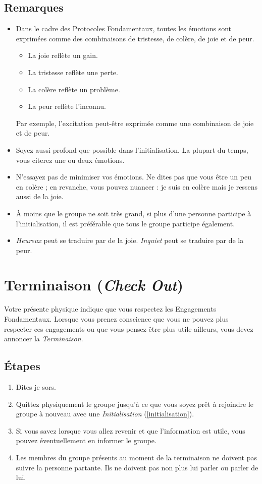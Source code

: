 \documentclass{book}
\newcommand*{\numref}[1]{{\hyperref[{#1}]{\autoref*{#1}}}}
\begin{document}
\subsection{Remarques}
\begin{itemize}
	\item Dans le cadre des Protocoles Fondamentaux, toutes les émotions sont exprimées comme des combinaisons de tristesse, de colère,
	      de joie et de peur.
	      \begin{itemize}
	      	\item La joie reflète un gain.
	      	\item La tristesse reflète une perte.
	      	\item La colère reflète un problème.
	      	\item La peur reflète l'inconnu.
	      \end{itemize}
	      Par exemple, l'excitation peut-être exprimée comme une combinaison de joie et de peur.
	\item Soyez aussi profond que possible dans l'initialisation. La plupart du temps, vous citerez une ou deux émotions. 
	\item N'essayez pas de minimiser vos émotions. Ne dites pas que vous être \og{}un peu\fg{} en colère ; en revanche, vous pouvez nuancer : 
	      \og{}je suis en colère mais je ressens aussi de la joie\fg{}.
	\item À moins que le groupe ne soit très grand, si plus d'une personne participe à l'initialisation, il est préférable que tous le groupe
	      participe également.
	\item \emph{Heureux} peut se traduire par de la joie. \emph{Inquiet} peut se traduire par de la peur.
\end{itemize}

\section{Terminaison (\emph{Check Out})}

Votre présente physique indique que vous respectez les Engagements Fondamentaux. Lorsque vous prenez conscience que vous ne pouvez plus
respecter ces engagements ou que vous pensez être plus utile ailleurs, vous devez annoncer la \emph{Terminaison}.

\subsection{Étapes}
\begin{enumerate}
	\item Dites \og{}je sors\fg{}.
	\item Quittez physiquement le groupe jusqu'à ce que vous soyez prêt à rejoindre le groupe à nouveau avec une \emph{Initialisation} (\numref{initialisation}).
	\item Si vous savez lorsque vous allez revenir et que l'information est utile, vous pouvez éventuellement en informer le groupe.
	\item Les membres du groupe présents au moment de la terminaison ne doivent pas suivre la personne partante. Ils ne doivent pas non plus lui parler ou 
	      parler de lui.
\end{enumerate}
\end{document}
